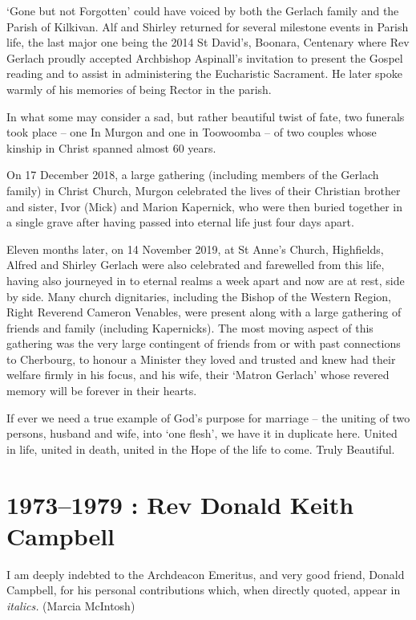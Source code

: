 `Gone but not Forgotten' could have voiced by both the Gerlach family
and the Parish of Kilkivan. Alf and Shirley returned for several
milestone events in Parish life, the last major one being the 2014 St
David's, Boonara, Centenary where Rev Gerlach proudly accepted
Archbishop Aspinall's invitation to present the Gospel reading and to
assist in administering the Eucharistic Sacrament. He later spoke warmly
of his memories of being Rector in the parish.

In what some may consider a sad, but rather beautiful twist of fate, two
funerals took place -- one In Murgon and one in Toowoomba -- of two
couples whose kinship in Christ spanned almost 60 years.

On 17 December 2018, a large gathering (including members of the Gerlach
family) in Christ Church, Murgon celebrated the lives of their Christian
brother and sister, Ivor (Mick) and Marion Kapernick, who were then
buried together in a single grave after having passed into eternal life
just four days apart.

Eleven months later, on 14 November 2019, at St Anne's Church,
Highfields, Alfred and Shirley Gerlach were also celebrated and
farewelled from this life, having also journeyed in to eternal realms a
week apart and now are at rest, side by side. Many church dignitaries,
including the Bishop of the Western Region, Right Reverend Cameron
Venables, were present along with a large gathering of friends and
family (including Kapernicks). The most moving aspect of this gathering
was the very large contingent of friends from or with past connections
to Cherbourg, to honour a Minister they loved and trusted and knew had
their welfare firmly in his focus, and his wife, their `Matron Gerlach'
whose revered memory will be forever in their hearts.

If ever we need a true example of God's purpose for marriage -- the
uniting of two persons, husband and wife, into `one flesh', we have it
in duplicate here. United in life, united in death, united in the Hope
of the life to come. Truly Beautiful.

\hypertarget{rev-donald-keith-campbell}{%
\chapter{1973--1979 : Rev Donald Keith
Campbell}\label{rev-donald-keith-campbell}}

I am deeply indebted to the Archdeacon Emeritus, and very good friend,
Donald Campbell, for his personal contributions which, when directly
quoted, appear in \emph{italics.} (Marcia McIntosh)


